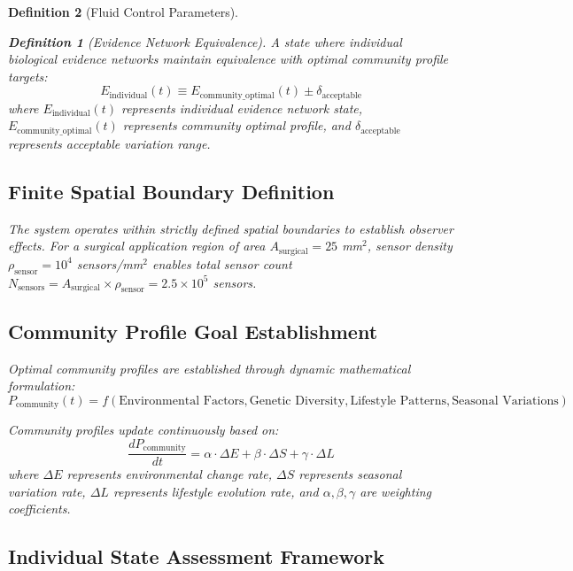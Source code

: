 \documentclass[12pt,a4paper]{article}
\newtheorem{definition}{Definition}
\begin{document}
\begin{definition}[Fluid Control Parameters]
\begin{definition}[Evidence Network Equivalence]
A state where individual biological evidence networks maintain equivalence with optimal community profile targets:
\begin{equation}
E_{\text{individual}}(t) \equiv E_{\text{community\_optimal}}(t) \pm \delta_{\text{acceptable}}
\end{equation}
where $E_{\text{individual}}(t)$ represents individual evidence network state, $E_{\text{community\_optimal}}(t)$ represents community optimal profile, and $\delta_{\text{acceptable}}$ represents acceptable variation range.
\end{definition}

\subsection{Finite Spatial Boundary Definition}

The system operates within strictly defined spatial boundaries to establish observer effects. For a surgical application region of area $A_{\text{surgical}} = 25$ mm$^2$, sensor density $\rho_{\text{sensor}} = 10^4$ sensors/mm$^2$ enables total sensor count $N_{\text{sensors}} = A_{\text{surgical}} \times \rho_{\text{sensor}} = 2.5 \times 10^5$ sensors.

\subsection{Community Profile Goal Establishment}

Optimal community profiles are established through dynamic mathematical formulation:
\begin{equation}
P_{\text{community}}(t) = f(\text{Environmental Factors}, \text{Genetic Diversity}, \text{Lifestyle Patterns}, \text{Seasonal Variations})
\end{equation}

Community profiles update continuously based on:
\begin{equation}
\frac{dP_{\text{community}}}{dt} = \alpha \cdot \Delta E + \beta \cdot \Delta S + \gamma \cdot \Delta L
\end{equation}
where $\Delta E$ represents environmental change rate, $\Delta S$ represents seasonal variation rate, $\Delta L$ represents lifestyle evolution rate, and $\alpha, \beta, \gamma$ are weighting coefficients.

\subsection{Individual State Assessment Framework}


\end{definition}
\end{document}
